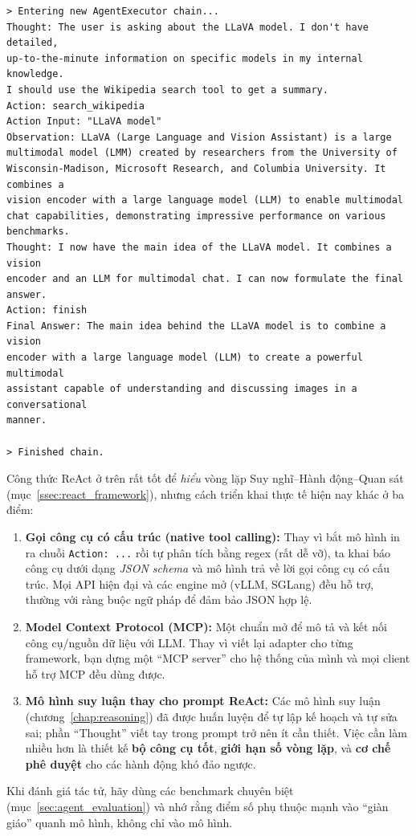 \begin{verbatim}
> Entering new AgentExecutor chain...
Thought: The user is asking about the LLaVA model. I don't have detailed,
up-to-the-minute information on specific models in my internal knowledge.
I should use the Wikipedia search tool to get a summary.
Action: search_wikipedia
Action Input: "LLaVA model"
Observation: LLaVA (Large Language and Vision Assistant) is a large
multimodal model (LMM) created by researchers from the University of
Wisconsin-Madison, Microsoft Research, and Columbia University. It combines a
vision encoder with a large language model (LLM) to enable multimodal
chat capabilities, demonstrating impressive performance on various benchmarks.
Thought: I now have the main idea of the LLaVA model. It combines a vision
encoder and an LLM for multimodal chat. I can now formulate the final answer.
Action: finish
Final Answer: The main idea behind the LLaVA model is to combine a vision
encoder with a large language model (LLM) to create a powerful multimodal
assistant capable of understanding and discussing images in a conversational
manner.

> Finished chain.
\end{verbatim}

\begin{tcolorbox}[title={Cập nhật 2026: Tác tử hiện đại không còn “diễn kịch” ReAct bằng text \newtag}, colback=blue!5!white, colframe=blue!60!black, fonttitle=\bfseries]
Công thức ReAct ở trên rất tốt để \emph{hiểu} vòng lặp Suy nghĩ--Hành động--Quan sát (mục~\ref{ssec:react_framework}), nhưng cách triển khai thực tế hiện nay khác ở ba điểm:
\begin{enumerate}
	\item \textbf{Gọi công cụ có cấu trúc (native tool calling):} Thay vì bắt mô hình in ra chuỗi \texttt{Action: ...} rồi tự phân tích bằng regex (rất dễ vỡ), ta khai báo công cụ dưới dạng \emph{JSON schema} và mô hình trả về lời gọi công cụ có cấu trúc. Mọi API hiện đại và các engine mở (vLLM, SGLang) đều hỗ trợ, thường với ràng buộc ngữ pháp để đảm bảo JSON hợp lệ.
	\item \textbf{Model Context Protocol (MCP):} Một chuẩn mở để mô tả và kết nối công cụ/nguồn dữ liệu với LLM. Thay vì viết lại adapter cho từng framework, bạn dựng một “MCP server” cho hệ thống của mình và mọi client hỗ trợ MCP đều dùng được.
	\item \textbf{Mô hình suy luận thay cho prompt ReAct:} Các mô hình suy luận (chương~\ref{chap:reasoning}) đã được huấn luyện để tự lập kế hoạch và tự sửa sai; phần “Thought” viết tay trong prompt trở nên ít cần thiết. Việc cần làm nhiều hơn là thiết kế \textbf{bộ công cụ tốt}, \textbf{giới hạn số vòng lặp}, và \textbf{cơ chế phê duyệt} cho các hành động khó đảo ngược.
\end{enumerate}
Khi đánh giá tác tử, hãy dùng các benchmark chuyên biệt (mục~\ref{sec:agent_evaluation}) và nhớ rằng điểm số phụ thuộc mạnh vào “giàn giáo” quanh mô hình, không chỉ vào mô hình.
\end{tcolorbox}